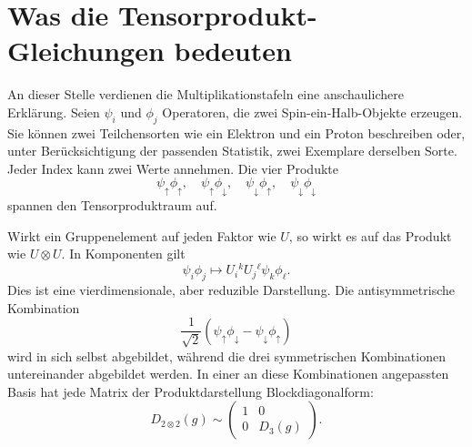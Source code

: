 \begin{classroomqa}
\end{classroomqa}

\section{Was die Tensorprodukt-Gleichungen bedeuten}

An dieser Stelle verdienen die Multiplikationstafeln eine anschaulichere Erklärung. Seien \(\psi_i\) und \(\phi_j\) Operatoren, die zwei Spin-ein-Halb-Objekte erzeugen. Sie können zwei Teilchensorten wie ein Elektron und ein Proton beschreiben oder, unter Berücksichtigung der passenden Statistik, zwei Exemplare derselben Sorte. Jeder Index kann zwei Werte annehmen. Die vier Produkte
\begin{equation}
\psi_\uparrow\phi_\uparrow,
\quad
\psi_\uparrow\phi_\downarrow,
\quad
\psi_\downarrow\phi_\uparrow,
\quad
\psi_\downarrow\phi_\downarrow
\end{equation}
spannen den Tensorproduktraum auf.

Wirkt ein Gruppenelement auf jeden Faktor wie \(U\), so wirkt es auf das Produkt wie \(U\otimes U\). In Komponenten gilt
\begin{equation}
\psi_i\phi_j
\longmapsto
U_i{}^kU_j{}^\ell\psi_k\phi_\ell.
\label{eq:l4-product-action}
\end{equation}
Dies ist eine vierdimensionale, aber reduzible Darstellung. Die antisymmetrische Kombination
\begin{equation}
\frac{1}{\sqrt2}
(\psi_\uparrow\phi_\downarrow
-\psi_\downarrow\phi_\uparrow)
\end{equation}
wird in sich selbst abgebildet, während die drei symmetrischen Kombinationen untereinander abgebildet werden. In einer an diese Kombinationen angepassten Basis hat jede Matrix der Produktdarstellung Blockdiagonalform:
\begin{equation}
D_{2\otimes2}(g)
\sim
\begin{pmatrix}
1&0\\
0&D_3(g)
\end{pmatrix}.
\label{eq:l4-spin-block-diagonal}
\end{equation}

